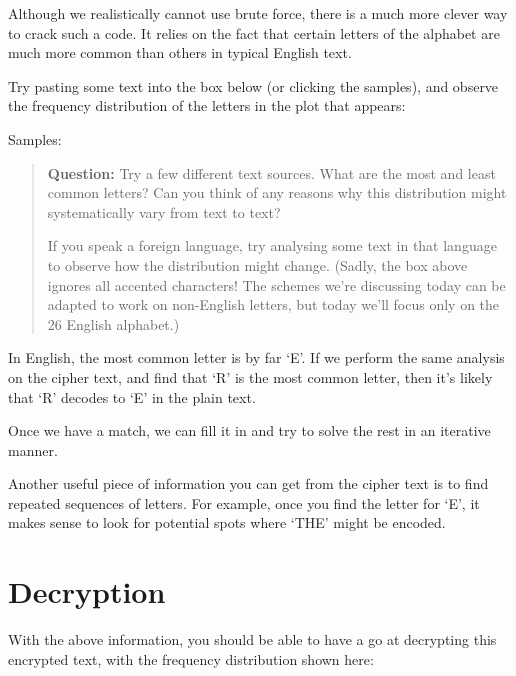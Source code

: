 \documentclass[
  letterpaper,
  DIV=11,
  numbers=noendperiod]{scrreprt}
\begin{document}
Although we realistically cannot use brute force, there is a much more
clever way to crack such a code. It relies on the fact that certain
letters of the alphabet are much more common than others in typical
English text.

Try pasting some text into the box below (or clicking the samples), and
observe the frequency distribution of the letters in the plot that
appears:

\leavevmode{}%
Samples:

\hypertarget{container}{}
\hypertarget{content}{}

\hypertarget{plot}{}

\begin{quote}
\textbf{Question:} Try a few different text sources. What are the most
and least common letters? Can you think of any reasons why this
distribution might systematically vary from text to text?

If you speak a foreign language, try analysing some text in that
language to observe how the distribution might change. (Sadly, the box
above ignores all accented characters! The schemes we're discussing
today can be adapted to work on non-English letters, but today we'll
focus only on the 26 English alphabet.)
\end{quote}

In English, the most common letter is by far `E'. If we perform the same
analysis on the cipher text, and find that `R' is the most common
letter, then it's likely that `R' decodes to `E' in the plain text.

Once we have a match, we can fill it in and try to solve the rest in an
iterative manner.

Another useful piece of information you can get from the cipher text is
to find repeated sequences of letters. For example, once you find the
letter for `E', it makes sense to look for potential spots where `THE'
might be encoded.

\hypertarget{decryption}{%
\section{Decryption}\label{decryption}}

With the above information, you should be able to have a go at
decrypting this encrypted text, with the frequency distribution shown
here:

\hypertarget{decode-container}{}
\hypertarget{content}{}

\hypertarget{decplot}{}
\end{document}
